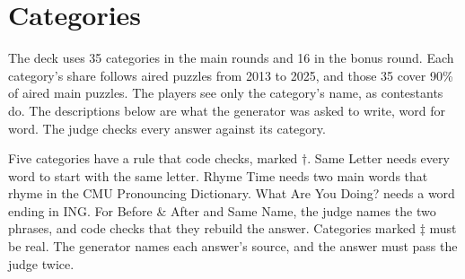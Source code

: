 \section{Categories}\label{app:categories}

The deck uses 35 categories in the main rounds and 16 in the bonus round. Each category's share follows aired puzzles from 2013 to 2025, and those 35 cover 90\% of aired main puzzles. The players see only the category's name, as contestants do. The descriptions below are what the generator was asked to write, word for word. The judge checks every answer against its category.

Five categories have a rule that code checks, marked $\dagger$. Same Letter needs every word to start with the same letter. Rhyme Time needs two main words that rhyme in the CMU Pronouncing Dictionary. What Are You Doing? needs a word ending in ING. For Before \& After and Same Name, the judge names the two phrases, and code checks that they rebuild the answer. Categories marked $\ddagger$ must be real. The generator names each answer's source, and the answer must pass the judge twice.

